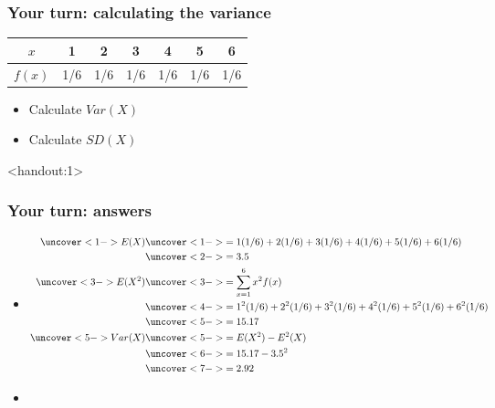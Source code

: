 \documentclass[handout]{beamer}\usepackage[]{graphicx}\usepackage[]{color}
\newcommand{\answers}{1}
\numberwithin{equation}{section}
\begin{document}
\begin{frame}
\frametitle{Your turn: calculating the variance}

\begin{tabular}{ccccccc}
$x$ & 1 & 2 & 3 & 4 & 5 & 6 \\ \hline
$f(x)$ & 1/6  & 1/6  & 1/6  & 1/6  & 1/6  & 1/6  \\
\end{tabular}

\begin{itemize}
\item Calculate $Var(X)$
\item Calculate $SD(X)$
\end{itemize}
\end{frame}


\begin{frame}<handout:\answers>
\frametitle{Your turn: answers} \scriptsize

\begin{itemize}
\item
\begin{align*}
\uncover<1->{E(X)} &\uncover<1->{= 1 (1/6) + 2(1/6) + 3(1/6) + 4(1/6) + 5(1/6) + 6 (1/6)} \\
&\uncover<2->{ = 3.5} \\
\uncover<3->{E(X^2)} & \uncover<3->{= \sum_{x = 1}^6 x^2 f(x)} \\
&\uncover<4->{ = 1^2 (1/6) + 2^2(1/6) + 3^2(1/6) + 4^2(1/6) + 5^2(1/6) + 6 ^2(1/6)}  \\
& \uncover<5->{=  15.17} \\
\uncover<5->{Var(X)} &\uncover<5->{ = E(X^2) - E^2(X)} \\
& \uncover<6->{= 15.17 - 3.5^2} \\
&\uncover<7->{ = 2.92}
\end{align*}
\item {}
\end{itemize}
\end{frame}
\end{document}
